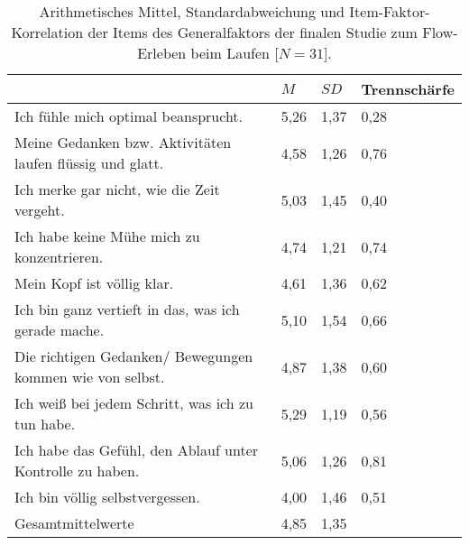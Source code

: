 \newpage
\begin{table}
	[!htb] \centering \caption[Item-Faktor-Korrelation der Items des Generalfaktors (Laufstudie -- interindividuell).]{Arithmetisches Mittel, Standardabweichung und Item-Faktor-Korrelation der Items des Generalfaktors der finalen Studie zum Flow-Erleben beim Laufen [$N = 31$].} \label{tab:generalfaktor_3} 
	\begin{tabularx}
		{ 
		\textwidth}{p{} p{} p{} p{}} \toprule & $M$ & $SD$ & Trennschärfe \\
		\midrule Ich fühle mich optimal beansprucht. & 5,26 & 1,37 & 0,28 \\
		Meine Gedanken bzw. Aktivitäten laufen flüssig und glatt. & 4,58 & 1,26 & 0,76 \\
		Ich merke gar nicht, wie die Zeit vergeht. & 5,03 & 1,45 & 0,40 \\
		Ich habe keine Mühe mich zu konzentrieren. & 4,74 & 1,21 & 0,74 \\
		Mein Kopf ist völlig klar. & 4,61 & 1,36 & 0,62 \\
		Ich bin ganz vertieft in das, was ich gerade mache. & 5,10 & 1,54 & 0,66 \\
		Die richtigen Gedanken/ Bewegungen kommen wie von selbst. & 4,87 & 1,38 & 0,60 \\
		Ich weiß bei jedem Schritt, was ich zu tun habe. & 5,29 & 1,19 & 0,56 \\
		Ich habe das Gefühl, den Ablauf unter Kontrolle zu haben. & 5,06 & 1,26 & 0,81 \\
		Ich bin völlig selbstvergessen. & 4,00 & 1,46 & 0,51 \\
		Gesamtmittelwerte & 4,85 & 1,35 & \\
		\bottomrule 
	\end{tabularx}
\end{table}
